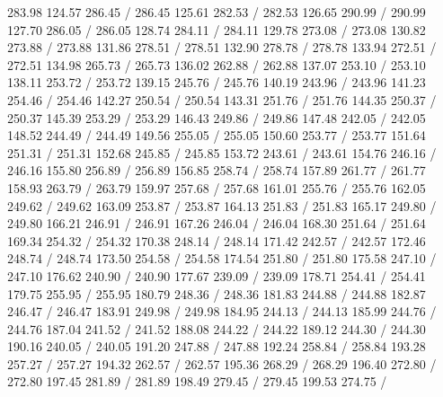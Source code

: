 { 283.98 124.57 286.45 /
 286.45 125.61 282.53 /
 282.53 126.65 290.99 /
 290.99 127.70 286.05 /
 286.05 128.74 284.11 /
 284.11 129.78 273.08 /
 273.08 130.82 273.88 /
 273.88 131.86 278.51 /
 278.51 132.90 278.78 /
 278.78 133.94 272.51 /
 272.51 134.98 265.73 /
 265.73 136.02 262.88 /
 262.88 137.07 253.10 /
 253.10 138.11 253.72 /
 253.72 139.15 245.76 /
 245.76 140.19 243.96 /
 243.96 141.23 254.46 /
 254.46 142.27 250.54 /
 250.54 143.31 251.76 /
 251.76 144.35 250.37 /
 250.37 145.39 253.29 /
 253.29 146.43 249.86 /
 249.86 147.48 242.05 /
 242.05 148.52 244.49 /
 244.49 149.56 255.05 /
 255.05 150.60 253.77 /
 253.77 151.64 251.31 /
 251.31 152.68 245.85 /
 245.85 153.72 243.61 /
 243.61 154.76 246.16 /
 246.16 155.80 256.89 /
 256.89 156.85 258.74 /
 258.74 157.89 261.77 /
 261.77 158.93 263.79 /
 263.79 159.97 257.68 /
 257.68 161.01 255.76 /
 255.76 162.05 249.62 /
 249.62 163.09 253.87 /
 253.87 164.13 251.83 /
 251.83 165.17 249.80 /
 249.80 166.21 246.91 /
 246.91 167.26 246.04 /
 246.04 168.30 251.64 /
 251.64 169.34 254.32 /
 254.32 170.38 248.14 /
 248.14 171.42 242.57 /
 242.57 172.46 248.74 /
 248.74 173.50 254.58 /
 254.58 174.54 251.80 /
 251.80 175.58 247.10 /
 247.10 176.62 240.90 /
 240.90 177.67 239.09 /
 239.09 178.71 254.41 /
 254.41 179.75 255.95 /
 255.95 180.79 248.36 /
 248.36 181.83 244.88 /
 244.88 182.87 246.47 /
 246.47 183.91 249.98 /
 249.98 184.95 244.13 /
 244.13 185.99 244.76 /
 244.76 187.04 241.52 /
 241.52 188.08 244.22 /
 244.22 189.12 244.30 /
 244.30 190.16 240.05 /
 240.05 191.20 247.88 /
 247.88 192.24 258.84 /
 258.84 193.28 257.27 /
 257.27 194.32 262.57 /
 262.57 195.36 268.29 /
 268.29 196.40 272.80 /
 272.80 197.45 281.89 /
 281.89 198.49 279.45 /
 279.45 199.53 274.75 /
}
